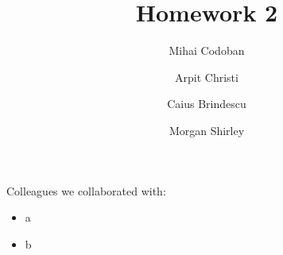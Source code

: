 \documentclass{article}
\title{Homework 2}
\author{Mihai Codoban \and Arpit Christi \and Caius Brindescu \and Morgan Shirley}
\begin{document}
\maketitle

Colleagues we collaborated with:
\begin{itemize}
	\item a
	\item b
\end{itemize}






\end{document}
